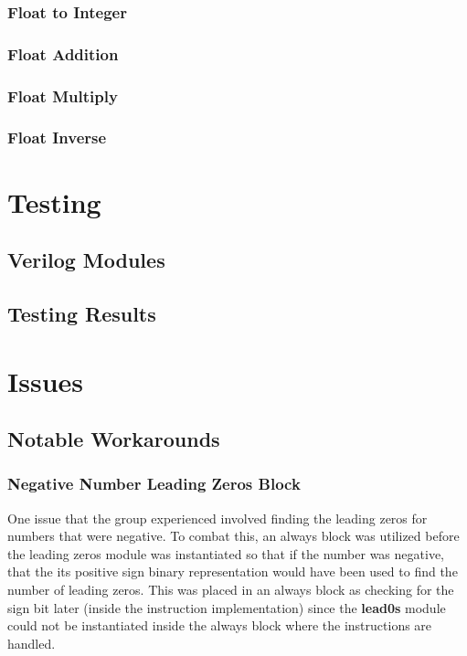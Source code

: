 \documentclass[conference]{IEEEtran}
\begin{document}
\subsubsection{Float to Integer}

\subsubsection{Float Addition}

\subsubsection{Float Multiply}

\subsubsection{Float Inverse}


\section{Testing}

\subsection{Verilog Modules}

\subsection{Testing Results}

\section{Issues}
\subsection{Notable Workarounds}
\subsubsection{Negative Number Leading Zeros Block}
One issue that the group experienced involved finding the leading zeros for numbers that were 
negative. To combat this, an always block was utilized before the leading zeros module was instantiated
so that if the number was negative, that the its positive sign binary representation would have been
used to find the number of leading zeros. This was placed in an always block as checking for the sign bit later 
(inside the instruction implementation) since the \textbf{lead0s} module could not be instantiated inside
the always block where the instructions are handled. 
\end{document}
